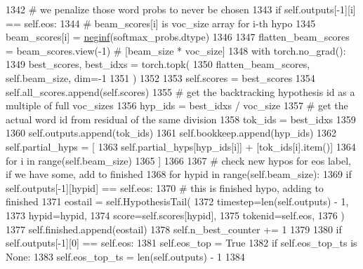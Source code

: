 \begin{DoxyCode}
1342                 \textcolor{comment}{# we penalize those word probs to never be chosen}
1343                 \textcolor{keywordflow}{if} self.outputs[-1][i] == self.eos:
1344                     \textcolor{comment}{# beam\_scores[i] is voc\_size array for i-th hypo}
1345                     beam\_scores[i] = \hyperlink{namespaceparlai_1_1utils_1_1torch_a6c6e25115353dba479cd72dc31dc76ae}{neginf}(softmax\_probs.dtype)
1346 
1347         flatten\_beam\_scores = beam\_scores.view(-1)  \textcolor{comment}{# [beam\_size * voc\_size]}
1348         with torch.no\_grad():
1349             best\_scores, best\_idxs = torch.topk(
1350                 flatten\_beam\_scores, self.beam\_size, dim=-1
1351             )
1352 
1353         self.scores = best\_scores
1354         self.all\_scores.append(self.scores)
1355         \textcolor{comment}{# get the backtracking hypothesis id as a multiple of full voc\_sizes}
1356         hyp\_ids = best\_idxs / voc\_size
1357         \textcolor{comment}{# get the actual word id from residual of the same division}
1358         tok\_ids = best\_idxs %
1359 
1360         self.outputs.append(tok\_ids)
1361         self.bookkeep.append(hyp\_ids)
1362         self.partial\_hyps = [
1363             self.partial\_hyps[hyp\_ids[i]] + [tok\_ids[i].item()]
1364             \textcolor{keywordflow}{for} i \textcolor{keywordflow}{in} range(self.beam\_size)
1365         ]
1366 
1367         \textcolor{comment}{#  check new hypos for eos label, if we have some, add to finished}
1368         \textcolor{keywordflow}{for} hypid \textcolor{keywordflow}{in} range(self.beam\_size):
1369             \textcolor{keywordflow}{if} self.outputs[-1][hypid] == self.eos:
1370                 \textcolor{comment}{#  this is finished hypo, adding to finished}
1371                 eostail = self.HypothesisTail(
1372                     timestep=len(self.outputs) - 1,
1373                     hypid=hypid,
1374                     score=self.scores[hypid],
1375                     tokenid=self.eos,
1376                 )
1377                 self.finished.append(eostail)
1378                 self.n\_best\_counter += 1
1379 
1380         \textcolor{keywordflow}{if} self.outputs[-1][0] == self.eos:
1381             self.eos\_top = \textcolor{keyword}{True}
1382             \textcolor{keywordflow}{if} self.eos\_top\_ts \textcolor{keywordflow}{is} \textcolor{keywordtype}{None}:
1383                 self.eos\_top\_ts = len(self.outputs) - 1
1384 
\end{DoxyCode}
\mbox{\label{classprojects_1_1controllable__dialogue_1_1controllable__seq2seq_1_1controllable__seq2seq_1_1Beam_a80fc3ae32d64b7b1dd19944b70b3db50}} 
